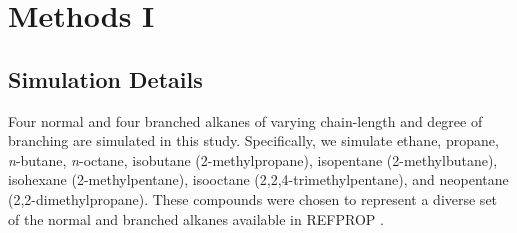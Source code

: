 \documentclass[journal=jctc,manuscript=article]{achemso}
\begin{document}

\section{Methods I} \label{Methods I}

\subsection{Simulation Details}
Four normal and four branched alkanes of varying chain-length and degree of branching are simulated in this study. Specifically, we simulate ethane, propane, \textit{n}-butane, \textit{n}-octane, isobutane (2-methylpropane), isopentane (2-methylbutane), isohexane (2-methylpentane), isooctane (2,2,4-trimethylpentane), and neopentane (2,2-dimethylpropane). These compounds were chosen to represent a diverse set of the normal and branched alkanes available in REFPROP \cite{LEMMON-RP91}.
\end{document}
